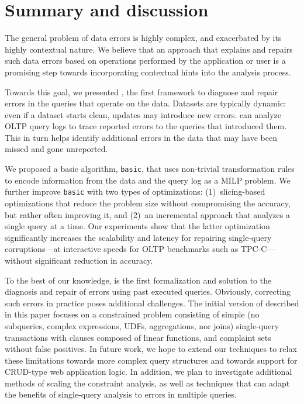 

\section{Summary and discussion}

The general problem of data errors is highly complex, and exacerbated by its highly contextual nature.
We believe that an approach that explains and repairs such data errors based on operations performed by the application or user is a promising step towards incorporating contextual hints into the analysis process.

Towards this goal, we presented \sys, the first framework to diagnose and
repair errors in the queries that operate on the data.
Datasets are typically dynamic: even if a dataset starts clean,
updates may introduce new errors. \sys can
analyze OLTP query logs to trace reported errors to the queries that
introduced them. This in turn helps identify additional errors
in the data that may have been missed and gone unreported.

We proposed a basic algorithm, \texttt{basic}, that uses non-trivial transformation rules to
encode information from the data and the query log as a MILP problem. We further improve 
\texttt{basic} with two types of optimizations: 
(1)~slicing-based optimizations that reduce the problem
size without compromising the accuracy, but rather often improving it, and 
(2)~an incremental approach that analyzes a single query at a time. 
Our experiments show that the latter
optimization significantly increases the scalability and latency for repairing single-query corruptions---at interactive speeds for OLTP benchmarks such as TPC-C---without significant reduction in accuracy.

To the best of our knowledge, \sys is the first formalization and solution to the diagnosis
and repair of errors using past executed queries. 
Obviously, correcting such errors in practice poses additional challenges. 
The initial version of \sys described in this paper focuses on a constrained problem consisting of
simple (no subqueries, complex expressions, UDFs, aggregations, nor joins)
single-query transactions with clauses composed of linear functions, and
complaint sets without false positives.
In future work, we hope to extend our techniques to relax these limitations towards more complex query structures and towards support for CRUD-type web application logic.
In addition, we plan to investigate additional methods of scaling the constraint analysis, 
as well as techniques that can adapt the benefits of single-query analysis to errors in multiple queries. 




